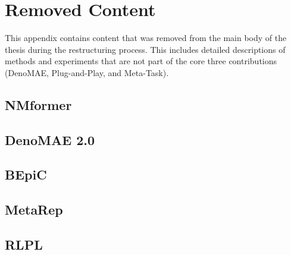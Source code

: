 \chapter{Removed Content}
\label{app:removed_content}

This appendix contains content that was removed from the main body of the thesis during the restructuring process. This includes detailed descriptions of methods and experiments that are not part of the core three contributions (DenoMAE, Plug-and-Play, and Meta-Task).

\section{NMformer}

\section{DenoMAE 2.0}

\section{BEpiC}

\section{MetaRep}

\section{RLPL}
